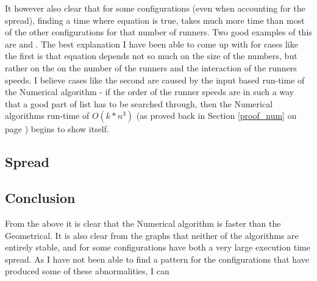 It however also clear that for some configurations (even when accounting for the spread), finding a time where equation  is true, takes much more time than most of the other configurations for that number of runners. Two good examples of this are  and . The best explanation I have been able to come up with for cases like the first is that equation  depends not so much on the size of the numbers, but rather on the on the number of the runners and the interaction of the runners speeds. I believe cases like the second are caused by the input based run-time of the Numerical algorithm - if the order of the runner speeds are in such a way that a good part of list has to be searched through, then the Numerical algorithms run-time of $O(k * n^3)$ (as proved back in Section \ref{proof_num} on page \pageref{proof_num}) begins to show itself.  

\subsection{Spread}
%



\subsection{Conclusion}

From the above it is clear that the Numerical algorithm is faster than the Geometrical. It is also clear from the graphs that neither of the algorithms are entirely stable, and for some configurations have both a very large execution time spread. As I have not been able to find a pattern for the configurations that have produced some of these abnormalities, I can 
